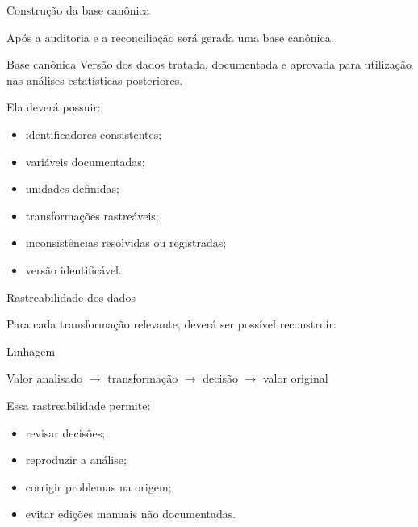 \begin{frame}{Construção da base canônica}

    Após a auditoria e a reconciliação será gerada uma base canônica.

    \vspace{0.3cm}

    \begin{block}{Base canônica}
        Versão dos dados tratada, documentada e aprovada para utilização
        nas análises estatísticas posteriores.
    \end{block}

    \vspace{0.3cm}

    Ela deverá possuir:

    \begin{itemize}
        \item identificadores consistentes;
        \item variáveis documentadas;
        \item unidades definidas;
        \item transformações rastreáveis;
        \item inconsistências resolvidas ou registradas;
        \item versão identificável.
    \end{itemize}

\end{frame}



\begin{frame}{Rastreabilidade dos dados}

    Para cada transformação relevante, deverá ser possível reconstruir:

    \vspace{0.3cm}

    \begin{block}{Linhagem}
        \centering

        Valor analisado
        $\rightarrow$
        transformação
        $\rightarrow$
        decisão
        $\rightarrow$
        valor original
    \end{block}

    \vspace{0.4cm}

    Essa rastreabilidade permite:

    \begin{itemize}
        \item revisar decisões;
        \item reproduzir a análise;
        \item corrigir problemas na origem;
        \item evitar edições manuais não documentadas.
    \end{itemize}

\end{frame}


